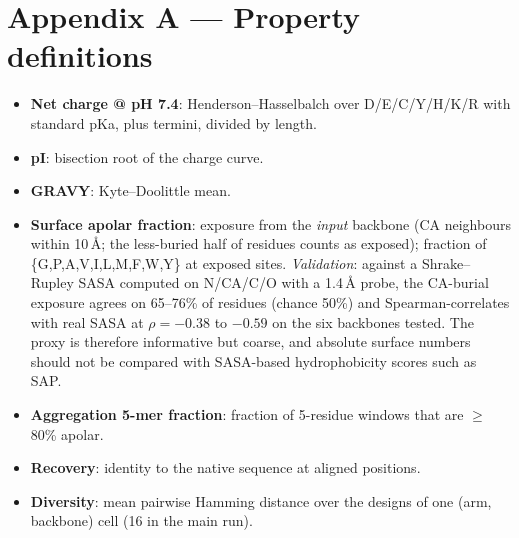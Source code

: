 \section*{Appendix A --- Property definitions}
\label{app:properties}

\begin{itemize}
\item \textbf{Net charge @ pH 7.4}: Henderson--Hasselbalch over D/E/C/Y/H/K/R
  with standard pKa, plus termini, divided by length.
\item \textbf{pI}: bisection root of the charge curve.
\item \textbf{GRAVY}: Kyte--Doolittle mean.
\item \textbf{Surface apolar fraction}: exposure from the \emph{input}
  backbone (CA neighbours within 10\,\AA; the less-buried half of residues
  counts as exposed); fraction of \{G,P,A,V,I,L,M,F,W,Y\} at exposed sites.
  \emph{Validation}: against a Shrake--Rupley SASA computed on N/CA/C/O with a
  1.4\,\AA{} probe, the CA-burial exposure
  agrees on 65--76\% of residues (chance 50\%) and Spearman-correlates with
  real SASA at $\rho = -0.38$ to $-0.59$ on the
  six backbones tested. The proxy is therefore informative but coarse, and
  absolute surface numbers should not be
  compared with SASA-based hydrophobicity scores such as SAP.
\item \textbf{Aggregation 5-mer fraction}: fraction of 5-residue windows that
  are $\geq$80\% apolar.
\item \textbf{Recovery}: identity to the native sequence at aligned positions.
\item \textbf{Diversity}: mean pairwise Hamming distance over the designs of one
  (arm, backbone) cell (16 in the main run).
\end{itemize}
